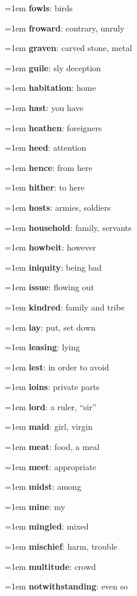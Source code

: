 {\begin{multicols}{3}
{\hangindent=1em \textbf{fowls}: birds\par
\hangindent=1em \textbf{froward}: contrary, unruly\par
\hangindent=1em \textbf{graven}: carved stone, metal\par
\hangindent=1em \textbf{guile}: sly deception\par
\hangindent=1em \textbf{habitation}: home\par
\hangindent=1em \textbf{hast}: you have\par
\hangindent=1em \textbf{heathen}: foreigners\par
\hangindent=1em \textbf{heed}: attention\par
\hangindent=1em \textbf{hence}: from here\par
\hangindent=1em \textbf{hither}: to here\par
\hangindent=1em \textbf{hosts}: armies, soldiers\par
\hangindent=1em \textbf{household}: family, servants\par
\hangindent=1em \textbf{howbeit}: however\par
\hangindent=1em \textbf{iniquity}: being bad\par
\hangindent=1em \textbf{issue}: flowing out\par
\hangindent=1em \textbf{kindred}: family and tribe\par
\hangindent=1em \textbf{lay}: put, set down\par
\hangindent=1em \textbf{leasing}: lying\par
\hangindent=1em \textbf{lest}: in order to avoid\par
\hangindent=1em \textbf{loins}: private parts\par
\hangindent=1em \textbf{lord}: a ruler, “sir”\par
\hangindent=1em \textbf{maid}: girl, virgin\par
\hangindent=1em \textbf{meat}: food, a meal\par
\hangindent=1em \textbf{meet}: appropriate\par
\hangindent=1em \textbf{midst}: among\par
\hangindent=1em \textbf{mine}: my\par
\hangindent=1em \textbf{mingled}: mixed\par
\hangindent=1em \textbf{mischief}: harm, trouble\par
\hangindent=1em \textbf{multitude}: crowd\par
\hangindent=1em \textbf{notwithstanding}: even so\par
}
\end{multicols}}
